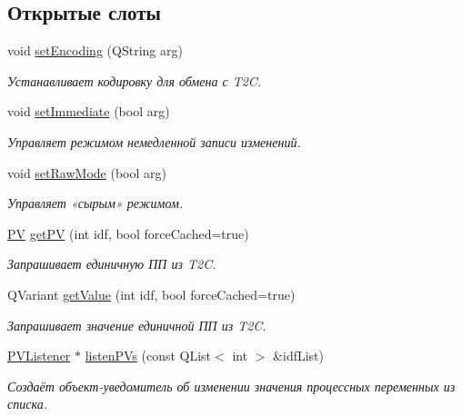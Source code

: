 \subsection*{Открытые слоты}
\begin{DoxyCompactItemize}
\item 
void \hyperlink{class_t2_c_manager_a43508413b4a7d90407e14f1d5005a0b5}{set\-Encoding} (Q\-String arg)
\begin{DoxyCompactList}\small\item\em Устанавливает кодировку для обмена с T2\-C. \end{DoxyCompactList}\item 
void \hyperlink{class_t2_c_manager_aa696512a3ebc03c497629ca19f903cad}{set\-Immediate} (bool arg)
\begin{DoxyCompactList}\small\item\em Управляет режимом немедленной записи изменений. \end{DoxyCompactList}\item 
void \hyperlink{class_t2_c_manager_a1d3657acdeeacde9e155b6924211eff1}{set\-Raw\-Mode} (bool arg)
\begin{DoxyCompactList}\small\item\em Управляет «сырым» режимом. \end{DoxyCompactList}\item 
\hyperlink{struct_p_v}{P\-V} \hyperlink{class_t2_c_manager_a015b9e2a04b88549b7c48e84e66a8a51}{get\-P\-V} (int idf, bool force\-Cached=true)
\begin{DoxyCompactList}\small\item\em Запрашивает единичную ПП из T2\-C. \end{DoxyCompactList}\item 
Q\-Variant \hyperlink{class_t2_c_manager_a82411769e15724e64a85e55ef8719d11}{get\-Value} (int idf, bool force\-Cached=true)
\begin{DoxyCompactList}\small\item\em Запрашивает значение единичной ПП из T2\-C. \end{DoxyCompactList}\item 
\hyperlink{class_p_v_listener}{P\-V\-Listener} $\ast$ \hyperlink{class_t2_c_manager_aa06c49b005285d39e1f93eb0721f718b}{listen\-P\-Vs} (const Q\-List$<$ int $>$ \&idf\-List)
\begin{DoxyCompactList}\small\item\em Создаёт объект-\/уведомитель об изменении значения процессных переменных из списка. \end{DoxyCompactList}\item 

\end{DoxyCompactItemize}
